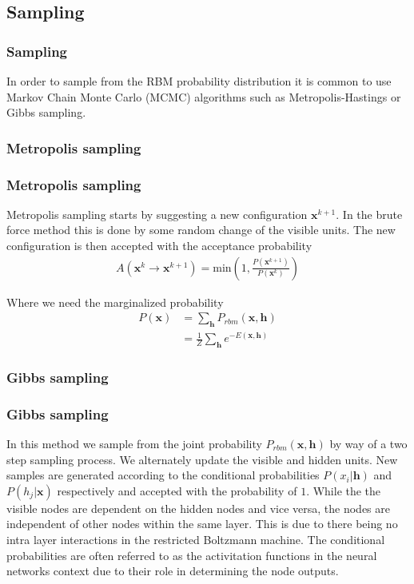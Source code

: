 \documentclass[norsk,a4paper,11pt]{beamer}
\begin{document}
\subsection{Sampling}
\begin{frame}
\frametitle{Sampling}
In order to sample from the RBM probability distribution it is common to use Markov Chain Monte Carlo (MCMC) algorithms such as Metropolis-Hastings or Gibbs sampling.
\end{frame}

\subsubsection{Metropolis sampling}
\begin{frame}
\frametitle{Metropolis sampling}
Metropolis sampling starts by suggesting a new configuration $\bm{x}^{k+1}$. In the brute force method this is done by some random change of the visible units. The new configuration is then accepted with the acceptance probability
\begin{align}
	A(\bm{x}^k \rightarrow \bm{x}^{k+1}) = \text{min} (1, \frac{P(\bm{x}^{k+1})}{P(\bm{x}^k)})
\end{align} 


Where we need the marginalized probability
\begin{align}
	P(\bm{x})  &= \sum_\mathbf{h} P_{rbm}(\mathbf{x}, \mathbf{h}) \\
				&= \frac{1}{Z}\sum_\mathbf{h} e^{-E(\mathbf{x}, \mathbf{h})}
\end{align}
\end{frame}


\subsubsection{Gibbs sampling}
\begin{frame}
\frametitle{Gibbs sampling}
In this method we sample from the joint probability $P_{rbm} (\bm{x}, \bm{h})$ by way of a two step sampling process. We alternately update the visible and hidden units.
New samples are generated according to the conditional probabilities $P(x_i|\bm{h})$ and $P(h_j|\bm{x})$ respectively and accepted with the probability of $1$. While the the visible nodes are dependent on the hidden nodes and vice versa, the nodes are independent of other nodes within the same layer. This is due to there being no intra layer interactions in the restricted Boltzmann machine.
The conditional probabilities are often referred to as the activitation functions in the neural networks context due to their role in determining the node outputs.
\end{frame}
\end{document}
